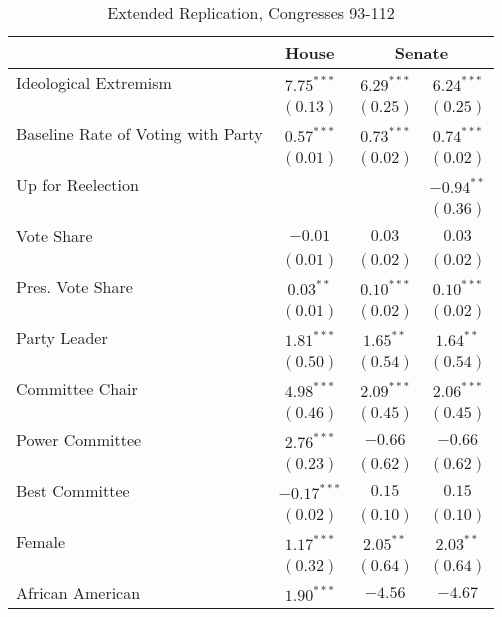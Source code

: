 \documentclass[12pt]{article}
\begin{document}
\begin{table}[H]
	\begin{center}
		\caption{Extended Replication, Congresses 93-112}
		\singlespacing
		\begin{tabular}{l c c c }
			\hline
			& House & \multicolumn{2}{c}{Senate} \\
			\hline
			Ideological Extremism & $7.75^{***}$  & $6.29^{***}$  & $6.24^{***}$  \\
			& $(0.13)$      & $(0.25)$      & $(0.25)$      \\
			Baseline Rate of Voting with Party              & $0.57^{***}$  & $0.73^{***}$  & $0.74^{***}$  \\
			& $(0.01)$      & $(0.02)$      & $(0.02)$      \\
			Up for Reelection    &               &               & $-0.94^{**}$  \\
			&               &               & $(0.36)$      \\
			Vote Share            & $-0.01$       & $0.03$        & $0.03$        \\
			& $(0.01)$      & $(0.02)$      & $(0.02)$      \\
			Pres. Vote Share      & $0.03^{**}$   & $0.10^{***}$  & $0.10^{***}$  \\
			& $(0.01)$      & $(0.02)$      & $(0.02)$      \\
			Party Leader                 & $1.81^{***}$  & $1.65^{**}$   & $1.64^{**}$   \\
			& $(0.50)$      & $(0.54)$      & $(0.54)$      \\
			Committee Chair                  & $4.98^{***}$  & $2.09^{***}$  & $2.06^{***}$  \\
			& $(0.46)$      & $(0.45)$      & $(0.45)$      \\
			Power Committee       & $2.76^{***}$  & $-0.66$       & $-0.66$       \\
			& $(0.23)$      & $(0.62)$      & $(0.62)$      \\
			Best Committee        & $-0.17^{***}$ & $0.15$        & $0.15$        \\
			& $(0.02)$      & $(0.10)$      & $(0.10)$      \\
			Female                 & $1.17^{***}$  & $2.05^{**}$   & $2.03^{**}$   \\
			& $(0.32)$      & $(0.64)$      & $(0.64)$      \\
			African American                   & $1.90^{***}$  & $-4.56$       & $-4.67$       \\

\end{tabular}
\end{center}
\end{table}
\end{document}

